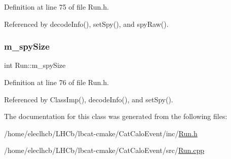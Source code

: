 Definition at line 75 of file Run.\+h.



Referenced by decode\+Info(), set\+Spy(), and spy\+Raw().

\mbox{\label{classRun_a343bd5a0475c262da9b366933cf3a523}} 
\subsubsection{\texorpdfstring{m\+\_\+spy\+Size}{m\_spySize}}
{\footnotesize\ttfamily int Run\+::m\+\_\+spy\+Size}



Definition at line 76 of file Run.\+h.



Referenced by Class\+Imp(), decode\+Info(), and set\+Spy().



The documentation for this class was generated from the following files\+:\begin{DoxyCompactItemize}
\item 
/home/eleclhcb/\+L\+H\+Cb/lbcat-\/cmake/\+Cat\+Calo\+Event/inc/\hyperlink{Run_8h}{Run.\+h}\item 
/home/eleclhcb/\+L\+H\+Cb/lbcat-\/cmake/\+Cat\+Calo\+Event/src/\hyperlink{Run_8cpp}{Run.\+cpp}\end{DoxyCompactItemize}
